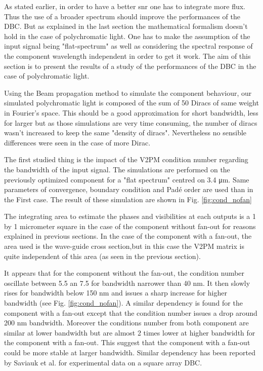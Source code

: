  As stated earlier, in order to have a better \gls{snr} one has to integrate more flux. Thus the use of a broader spectrum should improve the performances of the DBC. But as explained in the last section the mathematical formalism doesn't hold in the case of polychromatic light. One has to make the assumption of the input signal being "flat-spectrum" as well as considering the spectral response of the component wavelength independent in order to get it work. The aim of this section is to present the results of a study of the performances of the DBC in the case of polychromatic light. 
 
Using the Beam propagation method to simulate the component behaviour, our simulated polychromatic light is composed of the sum of 50 Diracs of same weight in Fourier's space.  This should be a good
approximation for short bandwidth, less for larger but as those simulations are very time consuming,
the number of diracs wasn't increased to keep the same "density of diracs". Nevertheless no sensible differences were seen in the case of more Dirac. 

The first studied thing is the impact of the V2PM condition number regarding the bandwidth of the input signal. The simulations are performed on the previously optimized component for a "flat spectrum" centred on 3.4 \si{\micro\meter}. Same parameters of convergence, boundary condition and Padé order are used than in the First case. The result of these simulation are shown in Fig.  \ref{fig:cond_nofan}

The integrating area to estimate the phases and visibilities at each outputs is a 1 by 1 micrometer square in the case of the component without fan-out for reasons explained in previous sections. In the case of the component with a fan-out, the area used is the wave-guide cross section,but in this case the V2PM matrix is quite independent of this area (as seen in the previous section).

It appears that for the component without the fan-out, the
condition number oscillate between 5.5 an 7.5 for bandwidth narrower
than 40 nm. It then slowly rises for bandwidth below 150 nm and issues
a sharp increase for higher bandwidth (see Fig.
\ref{fig:cond_nofan}). A similar dependency is found for the component with a fan-out except that the condition number issues a drop around 200 nm bandwidth. Moreover the conditions number from both component are similar at lower bandwidth but are almost 2 times lower at higher bandwidth for the component with a fan-out. This suggest that the component with a fan-out could be more stable at larger bandwidth. Similar dependency has been reported by Saviauk et al. \cite{saviauk} for experimental data on a square array DBC.  

